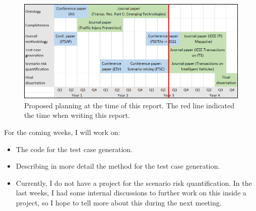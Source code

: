 \documentclass[10pt,final,a4paper,oneside,onecolumn]{article}
\begin{document}
\begin{figure}[t]
	\centering
	\includegraphics[width=\linewidth]{planning.png}
	\caption{Proposed planning at the time of this report. The red line indicated the time when writing this report.}
	\label{fig:planning}
\end{figure}

For the coming weeks, I will work on:
\begin{itemize}
	\item The code for the test case generation. 
	\item Describing in more detail the method for the test case generation.
	\item Currently, I do not have a project for the scenario risk quantification. In the last weeks, I had some internal discussions to further work on this inside a project, so I hope to tell more about this during the next meeting.
\end{itemize}


\printbibliography

%
\end{document}
